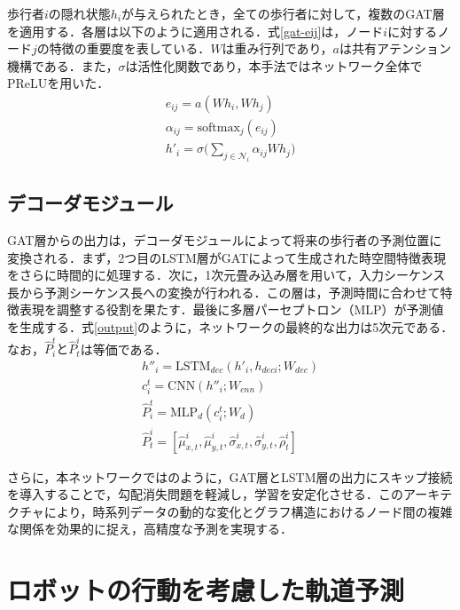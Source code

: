 歩行者$i$の隠れ状態$h_i$が与えられたとき，全ての歩行者に対して，複数のGAT層を適用する．各層は以下のように適用される．式\eqref{gat-eij}は，ノード$i$に対するノード$j$の特徴の重要度を表している．$W$は重み行列であり，$a$は共有アテンション機構である．また，$\sigma$は活性化関数であり，本手法ではネットワーク全体でPReLU\cite{he2015delving-prelu}を用いた．
\begin{align}
  e_{ij} = a(Wh_i, Wh_j) \label{gat-eij} \\
  \alpha_{ij} = \text{softmax}_{j}(e_{ij}) \\
  h'_i = \sigma\Bigg(\sum_{j \in \mathcal{N}_i} \alpha_{ij}Wh_j \Bigg)
\end{align}

\subsection{デコーダモジュール}\label{sec:decoder}
GAT層からの出力は，デコーダモジュールによって将来の歩行者の予測位置に変換される．まず，2つ目のLSTM層がGATによって生成された時空間特徴表現をさらに時間的に処理する．次に，1次元畳み込み層を用いて，入力シーケンス長から予測シーケンス長への変換が行われる．この層は，予測時間に合わせて特徴表現を調整する役割を果たす．最後に多層パーセプトロン（MLP）が予測値を生成する．式\eqref{output}のように，ネットワークの最終的な出力は5次元である．なお，$\hat{P}^t_i\text{と}\hat{P}^i_t$は等価である．
\begin{align}
  h''_i = \text{LSTM}_{dec}(h'_i, h_{deci}; W_{dec})\\
  c^t_i = \text{CNN}(h''_i; W_{cnn}) \\
  \hat{P}^t_i = \text{MLP}_{d}(c^t_i; W_{d}) \\
  \hat{P}^i_t = [\hat{\mu}^i_{x,t}, \hat{\mu}^i_{y, t}, \hat{\sigma}^i_{x, t}, \hat{\sigma}^i_{y, t}, \hat{\rho}^i_t] \label{output}
\end{align}

さらに，本ネットワークではのように，GAT層とLSTM層の出力にスキップ接続\cite{he2016deep-resnet}を導入することで，勾配消失問題\cite{hochreiter2001gradient-grad,weinleindiplomarbeit-grad, schmidhuber2015deep-grad}を軽減し，学習を安定化させる．このアーキテクチャにより，時系列データの動的な変化とグラフ構造におけるノード間の複雑な関係を効果的に捉え，高精度な予測を実現する．

\section{ロボットの行動を考慮した軌道予測}

